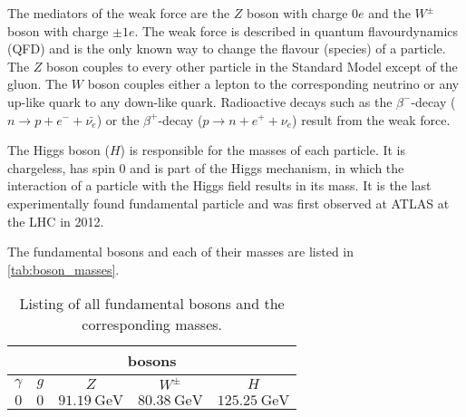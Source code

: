 The mediators of the weak force are the $Z$ boson with charge $0e$ and the $W^\pm$ boson with charge $\pm 1e$.
The weak force is described in quantum flavourdynamics (QFD) and is the only known way to change the flavour (species) of a particle.
The $Z$ boson couples to every other particle in the Standard Model except of the gluon.
The $W$ boson couples either a lepton to the corresponding neutrino or any up-like quark to any down-like quark.
Radioactive decays such as the $\beta^-$-decay ($n \rightarrow p + e^- + \bar{\nu_e}$) or the $\beta^+$-decay ($p \rightarrow n + e^+ + \nu_e$) result from the weak force.

The Higgs boson ($H$) is responsible for the masses of each particle.
It is chargeless, has spin $0$ and is part of the Higgs mechanism, in which the interaction of a particle with the Higgs field results in its mass.
It is the last experimentally found fundamental particle and was first observed at ATLAS at the LHC in 2012.

The fundamental bosons and each of their masses are listed in \autoref{tab:boson_masses}.

\begin{table}
    \centering
    \caption{Listing of all fundamental bosons and the corresponding masses. \cite{pdg}}
    \begin{tabular}{c c c c c}
        \toprule
        \multicolumn{5}{c}{bosons} \\
        \midrule
        $\gamma$ & $g$ & $Z$ & $W^\pm$ & $H$ \\
        $0$ & $0$ & $\qty{91.19}{\giga\eV}$ & $\qty{80.38}{\giga\eV}$ & $\qty{125.25}{\giga\eV}$ \\
        \bottomrule
    \end{tabular}
    \label{tab:boson_masses}
\end{table}

